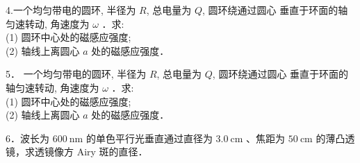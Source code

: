4.一个均匀带电的圆环, 半径为 $R$, 总电量为 $Q$, 圆环绕通过圆心
垂直于环面的轴匀速转动, 角速度为 $\omega$ ．求:\\
(1) 圆环中心处的磁感应强度;\\
(2) 轴线上离圆心 $a$ 处的磁感应强度．

5． 一个均匀带电的圆环, 半径为 $R$, 总电量为 $Q$, 圆环绕通过圆心 垂直于环面的轴匀速转动, 角速度为 $\omega$ ．求:\\
(1) 圆环中心处的磁感应强度;\\
(2) 轴线上离圆心 $a$ 处的磁感应强度．

6．波长为 $600 \mathrm{~nm}$ 的单色平行光垂直通过直径为 $3.0 \mathrm{~cm}$ 、焦距为 $50 \mathrm{~cm}$ 的薄凸透镜，求透镜像方 Airy 斑的直径．